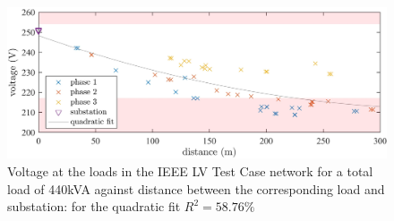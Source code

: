 \begin{figure}\centering
	\includegraphics{_chapter1/fig/voltage-drop-for-loads-along-feeder}
	\caption{Voltage at the loads in the IEEE LV Test Case network for a total load of 440kVA against distance between the corresponding load and substation: for the quadratic fit $R^2=58.76\%$}
	\label{ch1:fig:voltage-drop-for-loads-along-feeder}
\end{figure}
